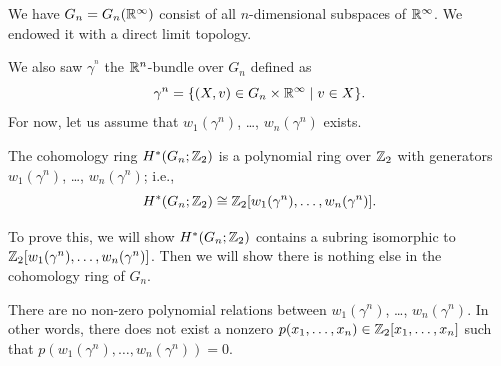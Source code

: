 

\begin{recall}
We have $G_{n}=G_{n}(\mathbb{R}^{\infty})$ consist of all $n$-dimensional
subspaces of $\mathbb{R}^{\infty}$. We endowed it with a direct limit
topology.

We also saw $\gamma^{^n}$ the $\mathbb{R}^{n}$-bundle over $G_{n}$ defined as
\begin{equation}
\gamma^{n}=\{(X,v)\in G_{n}\times\mathbb{R}^{\infty}\mid v\in X\}.
\end{equation}
For now, let us assume that $w_{1}(\gamma^{n})$, \dots,
$w_{n}(\gamma^{n})$ exists.
\end{recall}

\begin{theorem}\label{thm:math157A:lecture12:cohomology-of-grass}
The cohomology ring $H^{*}(G_{n};\mathbb{Z}_{2})$ is a polynomial ring over
$\mathbb{Z}_{2}$ with generators $w_{1}(\gamma^{n})$, \dots,
$w_{n}(\gamma^{n})$; i.e.,
\begin{equation}
H^{*}(G_{n};\mathbb{Z}_{2})\cong\mathbb{Z}_{2}[w_{1}(\gamma^{n}),\dots,w_{n}(\gamma^{n})].
\end{equation}
\end{theorem}

To prove this, we will show $H^{*}(G_{n};\mathbb{Z}_{2})$ contains a subring
isomorphic to
$\mathbb{Z}_{2}[w_{1}(\gamma^{n}),\dots,w_{n}(\gamma^{n})]$. Then we will
show there is nothing else in the cohomology ring of $G_{n}$.

\begin{lemma}
There are no non-zero polynomial relations between $w_{1}(\gamma^{n})$, \dots,
$w_{n}(\gamma^{n})$. In other words, there does not exist a nonzero
$p(x_{1},\dots,x_{n})\in\mathbb{Z}_{2}[x_{1},\dots,x_{n}]$ such that
$p(w_{1}(\gamma^{n}),\dots,w_{n}(\gamma^{n}))=0$.
\end{lemma}

